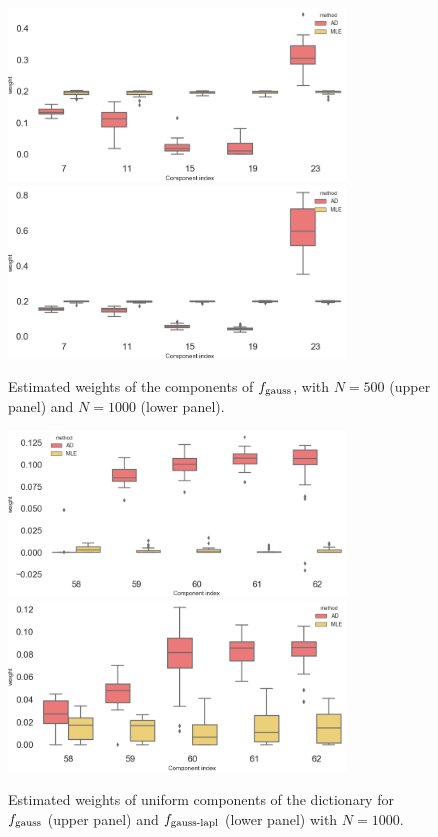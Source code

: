 \begin{figure}
\center
    \includegraphics[width=0.8\textwidth]{./TeX_files/weight_f_gauss_real_comp_N_500.png}
    \includegraphics[width=0.8\textwidth]{./TeX_files/weight_f_gauss_real_comp_N_1000.png}
    \caption{Estimated weights of the components of $f_{\textnormal{gauss}}$, with $N=500$ (upper panel) and $N=1000$
    (lower panel).}
    \label{fig:weights_gauss_real_indexes}
\end{figure}
\begin{figure}
\center
    \includegraphics[width=0.8\textwidth]{./TeX_files/weight_f_gauss_unif_comp_N_1000.png}
    \includegraphics[width=0.8\textwidth]{./TeX_files/weight_f_gauss_laplace_unif_comp_N_1000.png}
    \caption{Estimated weights of uniform components of the dictionary for 
    $f_{\textnormal{gauss}}$ (upper panel) and $f_{\textnormal{gauss-lapl}}$ (lower panel) with $N=1000$.}
    \label{fig:weights_gauss_and_laplace_unif_indexes}
\end{figure}

